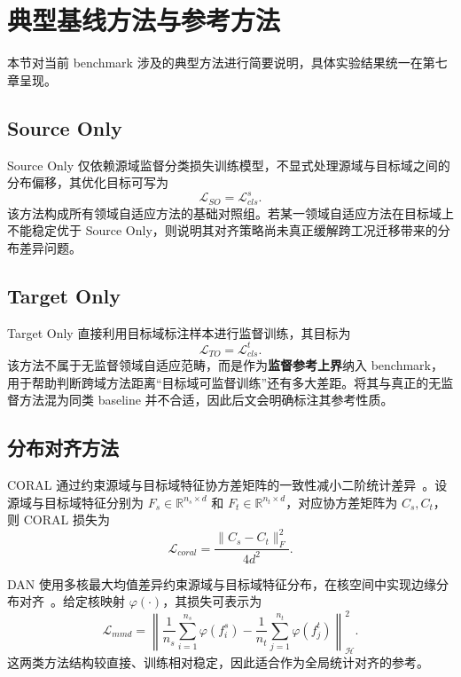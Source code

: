 \section{典型基线方法与参考方法}
本节对当前 benchmark 涉及的典型方法进行简要说明，具体实验结果统一在第七章呈现。

\subsection{Source Only}
Source Only 仅依赖源域监督分类损失训练模型，不显式处理源域与目标域之间的分布偏移，其优化目标可写为
\begin{equation}
\mathcal{L}_{SO}=\mathcal{L}_{cls}^{s}.
\end{equation}
该方法构成所有领域自适应方法的基础对照组。若某一领域自适应方法在目标域上不能稳定优于 Source Only，则说明其对齐策略尚未真正缓解跨工况迁移带来的分布差异问题。

\subsection{Target Only}
Target Only 直接利用目标域标注样本进行监督训练，其目标为
\begin{equation}
\mathcal{L}_{TO}=\mathcal{L}_{cls}^{t}.
\end{equation}
该方法不属于无监督领域自适应范畴，而是作为\textbf{监督参考上界}纳入 benchmark，用于帮助判断跨域方法距离“目标域可监督训练”还有多大差距。将其与真正的无监督方法混为同类 baseline 并不合适，因此后文会明确标注其参考性质。

\subsection{分布对齐方法}
CORAL 通过约束源域与目标域特征协方差矩阵的一致性减小二阶统计差异~\cite{sun2016deep}。设源域与目标域特征分别为 $F_s\in\mathbb{R}^{n_s\times d}$ 和 $F_t\in\mathbb{R}^{n_t\times d}$，对应协方差矩阵为 $C_s,C_t$，则 CORAL 损失为
\begin{equation}
\mathcal{L}_{coral}=
\frac{\|C_s-C_t\|_F^2}{4d^2}.
\end{equation}

DAN 使用多核最大均值差异约束源域与目标域特征分布，在核空间中实现边缘分布对齐~\cite{long2015dan}。给定核映射 $\varphi(\cdot)$，其损失可表示为
\begin{equation}
\mathcal{L}_{mmd}=
\left\|
\frac{1}{n_s}\sum_{i=1}^{n_s}\varphi(f_i^s)-
\frac{1}{n_t}\sum_{j=1}^{n_t}\varphi(f_j^t)
\right\|_{\mathcal{H}}^{2}.
\end{equation}
这两类方法结构较直接、训练相对稳定，因此适合作为全局统计对齐的参考。

